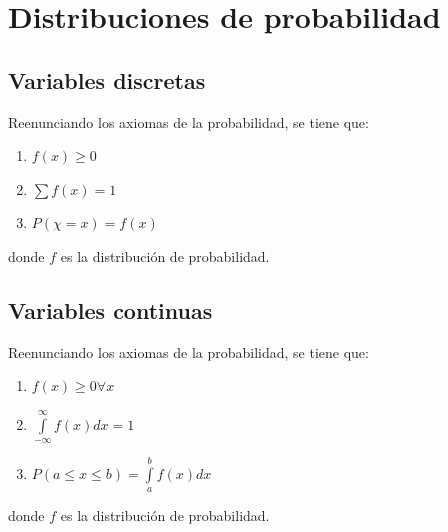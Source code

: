 \section{Distribuciones de probabilidad}
\subsection{Variables discretas}
Reenunciando los axiomas de la probabilidad, se tiene que:\begin{enumerate}
    \item $f(x)\geq 0$
    \item $\sum f(x) = 1$
    \item $P(\chi =x) = f(x)$
\end{enumerate}
donde $f$ es la distribución de probabilidad.
\subsection{Variables continuas}
Reenunciando los axiomas de la probabilidad, se tiene que:\begin{enumerate}
    \item $f(x)\geq 0 \forall x$
    \item $\int\limits_{-\infty}^\infty f(x)dx=1$
    \item $P(a\le x \leq b) = \int\limits_a^b f(x)dx $
\end{enumerate}
donde $f$ es la distribución de probabilidad.
